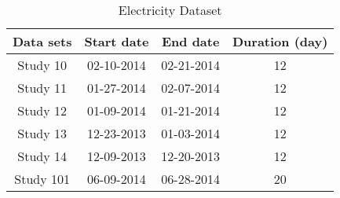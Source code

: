 \begin{table}[!t]
\renewcommand{\arraystretch}{1.3}
\caption{Electricity Dataset}
\label{table_datasets}
\centering
\begin{tabular}{|c|c|c|c|}
\hline
Data sets & Start date & End date & Duration (day) \\
\hline
\hline
Study 10 & 02-10-2014 & 02-21-2014 & 12\\
\hline
Study 11 & 01-27-2014 & 02-07-2014 & 12\\
\hline
Study 12 & 01-09-2014 & 01-21-2014 & 12\\
\hline
Study 13 & 12-23-2013 & 01-03-2014 & 12\\
\hline
Study 14 & 12-09-2013 & 12-20-2013 & 12\\
\hline
Study 101 & 06-09-2014 & 06-28-2014 & 20\\
\hline
\end{tabular}
\end{table}